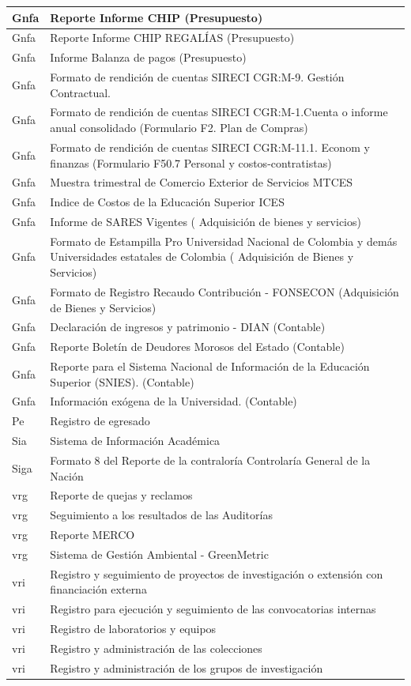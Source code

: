 \documentclass[
]{book}
\begin{document}
\begin{table}
\begin{tabular}[t]{l|l}
\hline
Gnfa & Reporte Informe CHIP (Presupuesto)\\
\hline
Gnfa & Reporte Informe CHIP REGALÍAS (Presupuesto)\\
\hline
Gnfa & Informe Balanza de pagos (Presupuesto)\\
\hline
Gnfa & Formato de rendición de cuentas SIRECI CGR:M-9. Gestión Contractual.\\
\hline
Gnfa & Formato de rendición de cuentas SIRECI CGR:M-1.Cuenta o informe anual consolidado (Formulario F2. Plan de Compras)\\
\hline
Gnfa & Formato de rendición de cuentas SIRECI CGR:M-11.1. Econom y finanzas (Formulario F50.7 Personal y costos-contratistas)\\
\hline
Gnfa & Muestra trimestral de Comercio Exterior de Servicios MTCES\\
\hline
Gnfa & Indice de Costos de la Educación Superior ICES\\
\hline
Gnfa & Informe de SARES Vigentes ( Adquisición de bienes y servicios)\\
\hline
Gnfa & Formato de Estampilla Pro Universidad Nacional de Colombia y demás Universidades estatales de Colombia ( Adquisición de Bienes y Servicios)\\
\hline
Gnfa & Formato de Registro Recaudo Contribución - FONSECON (Adquisición de Bienes y Servicios)\\
\hline
Gnfa & Declaración de ingresos y patrimonio - DIAN (Contable)\\
\hline
Gnfa & Reporte Boletín de Deudores Morosos del Estado (Contable)\\
\hline
Gnfa & Reporte para el Sistema Nacional de Información de la Educación Superior (SNIES). (Contable)\\
\hline
Gnfa & Información exógena de la Universidad. (Contable)\\
\hline
Pe & Registro de egresado\\
\hline
Sia & Sistema de Información Académica\\
\hline
Siga & Formato 8 del Reporte de la contraloría Controlaría General de la Nación\\
\hline
vrg & Reporte de quejas y reclamos\\
\hline
vrg & Seguimiento a los resultados de las Auditorías\\
\hline
vrg & Reporte MERCO\\
\hline
vrg & Sistema de Gestión Ambiental - GreenMetric\\
\hline
vri & Registro y seguimiento de proyectos de investigación o extensión con financiación externa\\
\hline
vri & Registro para ejecución y seguimiento de las convocatorias internas\\
\hline
vri & Registro de laboratorios y equipos\\
\hline
vri & Registro y administración de las colecciones\\
\hline
vri & Registro y administración de los grupos de investigación\\
\hline
\end{tabular}
\end{table}
\end{document}
